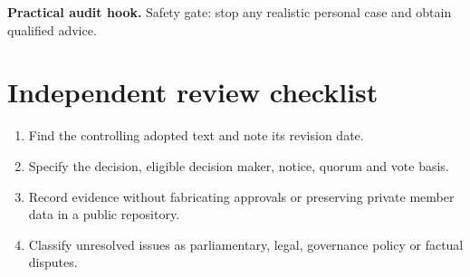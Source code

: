 \documentclass[11pt]{article}
\begin{document}
\textbf{Practical audit hook.} Safety gate: stop any realistic personal case and obtain qualified advice.

\section{Independent review checklist}
\begin{enumerate}[leftmargin=*,itemsep=4pt]
\item Find the controlling adopted text and note its revision date.
\item Specify the decision, eligible decision maker, notice, quorum and vote basis.
\item Record evidence without fabricating approvals or preserving private member data in a public repository.
\item Classify unresolved issues as parliamentary, legal, governance policy or factual disputes.
\end{enumerate}
\end{document}
